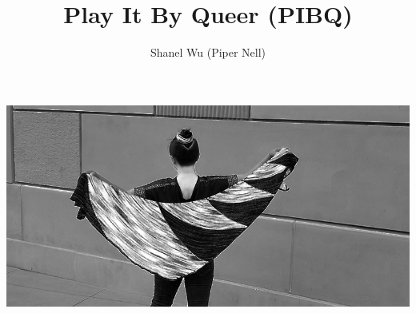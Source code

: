\documentclass[12pt]{article}
\title{Play It By Queer (PIBQ)} %
\author{Shanel Wu (Piper Nell)}
\begin{document}

\includegraphics[width=\linewidth]{pics_BW/_spread2}

\vspace{1.5em}

\raggedright
{\selectfont
\HUGE\textbf{\thetitle} \normalsize
\\\vspace{0.5em}
\theauthor
}
\end{document}
